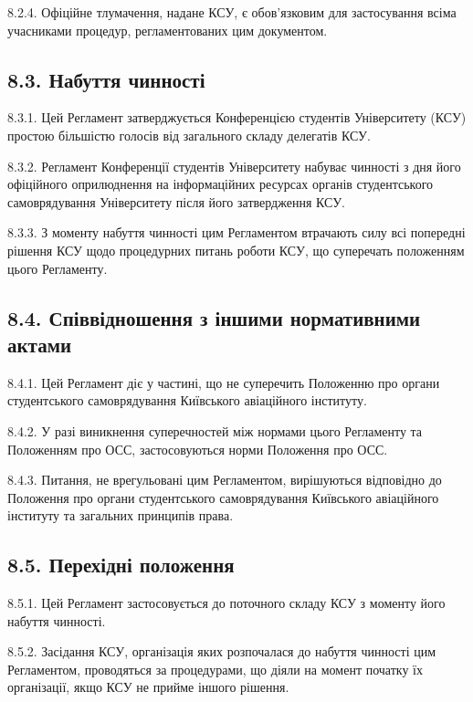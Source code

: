     8.2.4. Офіційне тлумачення, надане КСУ, є обов'язковим для застосування всіма учасниками процедур, регламентованих цим документом.

\subsection*{8.3. Набуття чинності}
    8.3.1. Цей Регламент затверджується Конференцією студентів Університету (КСУ) простою більшістю голосів від загального складу делегатів КСУ.

    8.3.2. Регламент Конференції студентів Університету набуває чинності з дня його офіційного оприлюднення на інформаційних ресурсах органів студентського самоврядування Університету після його затвердження КСУ.

    8.3.3. З моменту набуття чинності цим Регламентом втрачають силу всі попередні рішення КСУ щодо процедурних питань роботи КСУ, що суперечать положенням цього Регламенту.

\subsection*{8.4. Співвідношення з іншими нормативними актами}
    8.4.1. Цей Регламент діє у частині, що не суперечить Положенню про органи студентського самоврядування Київського авіаційного інституту.

    8.4.2. У разі виникнення суперечностей між нормами цього Регламенту та Положенням про ОСС, застосовуються норми Положення про ОСС.

    8.4.3. Питання, не врегульовані цим Регламентом, вирішуються відповідно до Положення про органи студентського самоврядування Київського авіаційного інституту та загальних принципів права.

\subsection*{8.5. Перехідні положення}
    8.5.1. Цей Регламент застосовується до поточного складу КСУ з моменту його набуття чинності.

    8.5.2. Засідання КСУ, організація яких розпочалася до набуття чинності цим Регламентом, проводяться за процедурами, що діяли на момент початку їх організації, якщо КСУ не прийме іншого рішення.
